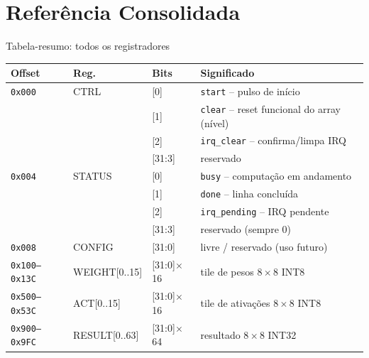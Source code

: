 \documentclass[aspectratio=169,10pt]{beamer}
\begin{document}
\section{Referência Consolidada}

\begin{frame}{Tabela-resumo: todos os registradores}
  \tiny
  \begin{tabularx}{\linewidth}{lllX}
    \toprule
    \textbf{Offset} & \textbf{Reg.} & \textbf{Bits} & \textbf{Significado} \\
    \midrule
    \texttt{0x000} & CTRL   & [0] & \texttt{start} -- pulso de início \\
                    &        & [1] & \texttt{clear} -- reset funcional do array (nível) \\
                    &        & [2] & \texttt{irq\_clear} -- confirma/limpa IRQ \\
                    &        & [31:3] & reservado \\
    \texttt{0x004} & STATUS & [0] & \texttt{busy} -- computação em andamento \\
                    &        & [1] & \texttt{done} -- linha concluída \\
                    &        & [2] & \texttt{irq\_pending} -- IRQ pendente \\
                    &        & [31:3] & reservado (sempre 0) \\
    \texttt{0x008} & CONFIG & [31:0] & livre / reservado (uso futuro) \\
    \texttt{0x100--0x13C} & WEIGHT[0..15] & [31:0]$\times$16 & tile de pesos $8\times8$ INT8 \\
    \texttt{0x500--0x53C} & ACT[0..15]    & [31:0]$\times$16 & tile de ativações $8\times8$ INT8 \\
    \texttt{0x900--0x9FC} & RESULT[0..63] & [31:0]$\times$64 & resultado $8\times8$ INT32 \\
    \bottomrule
  \end{tabularx}


\end{frame}
\end{document}
